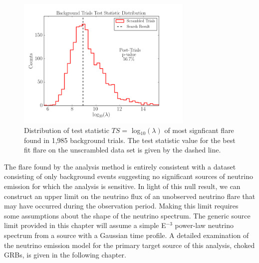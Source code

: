 \documentclass{gatech-thesis}
\begin{document}
\begin{figure}[ht]
  \begin{center}
    \includegraphics[width=0.75\textwidth,keepaspectratio]{TestStatisticDistribution_WithResult.png}
  \end{center}
  \caption[Test Statistic Distribution With Result]{Distribution of test statistic $TS =$ log$_{10}(\lambda)$ of most signficant flare found in 1,985 background trials. The test statistic value for the best fit flare on the unscrambled data set is given by the dashed line.}
  \label{fig:PostTrialsComparison}
\end{figure}

The flare found by the analysis method is entirely consistent with a dataset consisting of only background events suggesting no significant sources of neutrino emission for which the analysis is sensitive. In light of this null result, we can construct an upper limit on the neutrino flux of an unobserved neutrino flare that may have occurred during the observation period. Making this limit requires some assumptions about the shape of the neutrino spectrum. The generic source limit provided in this chapter will assume a simple E$^{-3}$ power-law neutrino spectrum from a source with a Gaussian time profile. A detailed examination of the neutrino emission model for the primary target source of this analysis, choked GRBs, is given in the following chapter.
\end{document}
